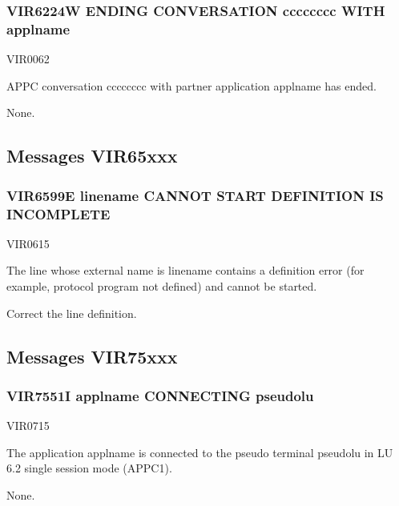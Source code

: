 \documentclass[letterpaper,10pt,english]{sphinxmanual}
\begin{document}
\subsubsection{VIR6224W ENDING CONVERSATION cccccccc WITH applname}
\label{\detokenize{messages:vir6224w-ending-conversation-cccccccc-with-applname}}\begin{description}
\sphinxAtStartPar
VIR0062

\sphinxAtStartPar
APPC conversation cccccccc with partner application applname has ended.

\sphinxAtStartPar
None.

\end{description}


\subsection{Messages VIR65xxx}
\label{\detokenize{messages:messages-vir65xxx}}

\subsubsection{VIR6599E linename CANNOT START \sphinxhyphen{}DEFINITION IS INCOMPLETE}
\label{\detokenize{messages:vir6599e-linename-cannot-start-definition-is-incomplete}}\begin{description}
\sphinxAtStartPar
VIR0615

\sphinxAtStartPar
The line whose external name is linename contains a definition error (for example, protocol program not defined) and cannot be started.

\sphinxAtStartPar
Correct the line definition.

\end{description}


\subsection{Messages VIR75xxx}
\label{\detokenize{messages:messages-vir75xxx}}

\subsubsection{VIR7551I applname CONNECTING pseudolu}
\label{\detokenize{messages:vir7551i-applname-connecting-pseudolu}}\begin{description}
\sphinxAtStartPar
VIR0715

\sphinxAtStartPar
The application applname is connected to the pseudo terminal pseudolu in LU 6.2 single session mode (APPC1).

\sphinxAtStartPar
None.

\end{description}
\end{document}
